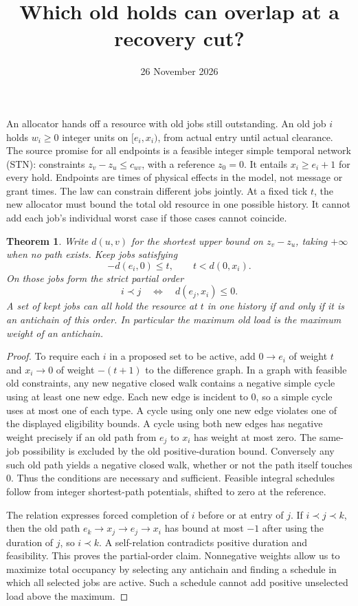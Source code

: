 \documentclass[11pt]{article}
\title{Which old holds can overlap at a recovery cut?}
\author{}
\date{26 November 2026}
\newtheorem{theorem}{Theorem}
\begin{document}
\maketitle

An allocator hands off a resource with old jobs still outstanding. An old job $i$ holds $w_i\ge0$ integer units on $[e_i,x_i)$, from actual entry until actual clearance. The source promise for all endpoints is a feasible integer simple temporal network (STN): constraints $z_v-z_u\le c_{uv}$, with a reference $z_0=0$. It entails $x_i\ge e_i+1$ for every hold. Endpoints are times of physical effects in the model, not message or grant times. The law can constrain different jobs jointly. At a fixed tick $t$, the new allocator must bound the total old resource in one possible history. It cannot add each job's individual worst case if those cases cannot coincide.

\begin{theorem}
Write $d(u,v)$ for the shortest upper bound on $z_v-z_u$, taking $+\infty$ when no path exists. Keep jobs satisfying
\[
   -d(e_i,0)\le t,\qquad t<d(0,x_i).
\]
On those jobs form the strict partial order
\[
   i\prec j \quad\Longleftrightarrow\quad d(e_j,x_i)\le0 .
\]
A set of kept jobs can all hold the resource at $t$ in one history if and only if it is an antichain of this order. In particular the maximum old load is the maximum weight of an antichain.
\end{theorem}

\begin{proof}
To require each $i$ in a proposed set to be active, add $0\to e_i$ of weight $t$ and $x_i\to0$ of weight $-(t+1)$ to the difference graph. In a graph with feasible old constraints, any new negative closed walk contains a negative simple cycle using at least one new edge. Each new edge is incident to $0$, so a simple cycle uses at most one of each type. A cycle using only one new edge violates one of the displayed eligibility bounds. A cycle using both new edges has negative weight precisely if an old path from $e_j$ to $x_i$ has weight at most zero. The same-job possibility is excluded by the old positive-duration bound. Conversely any such old path yields a negative closed walk, whether or not the path itself touches $0$. Thus the conditions are necessary and sufficient. Feasible integral schedules follow from integer shortest-path potentials, shifted to zero at the reference.

The relation expresses forced completion of $i$ before or at entry of $j$. If $i\prec j\prec k$, then the old path $e_k\to x_j\to e_j\to x_i$ has bound at most $-1$ after using the duration of $j$, so $i\prec k$. A self-relation contradicts positive duration and feasibility. This proves the partial-order claim. Nonnegative weights allow us to maximize total occupancy by selecting any antichain and finding a schedule in which all selected jobs are active. Such a schedule cannot add positive unselected load above the maximum.
\end{proof}
\end{document}
